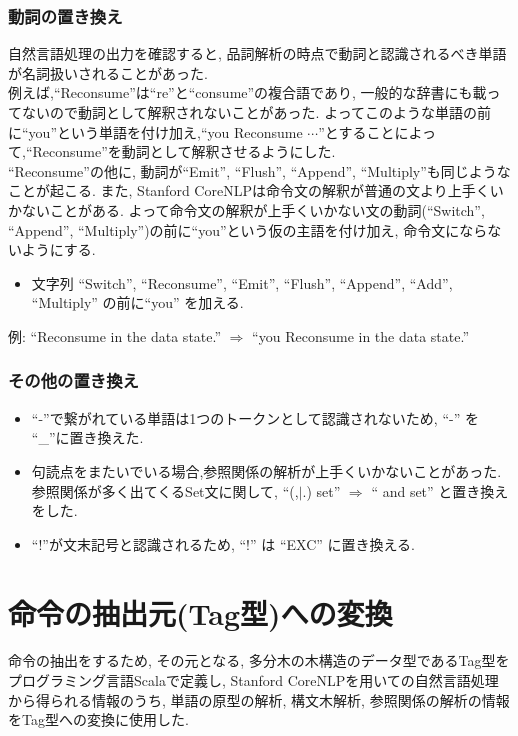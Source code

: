 \documentclass[uplatex,a4j]{jsreport}
\begin{document}
\subsubsection*{動詞の置き換え}
自然言語処理の出力を確認すると, 品詞解析の時点で動詞と認識されるべき単語が名詞扱いされることがあった.\\
例えば,``Reconsume''は``re''と``consume''の複合語であり, 一般的な辞書にも載ってないので動詞として解釈されないことがあった.
よってこのような単語の前に``you''という単語を付け加え,``you Reconsume $\cdots$''とすることによって,``Reconsume''を動詞として解釈させるようにした.\\
``Reconsume''の他に, 動詞が``Emit'', ``Flush'', ``Append'', ``Multiply''も同じようなことが起こる.
また, Stanford CoreNLPは命令文の解釈が普通の文より上手くいかないことがある.
よって命令文の解釈が上手くいかない文の動詞(``Switch'', ``Append'', ``Multiply'')の前に``you''という仮の主語を付け加え, 命令文にならないようにする.
\begin{itemize}
   \item 文字列 ``Switch'', ``Reconsume'', ``Emit'', ``Flush'', ``Append'', ``Add'', ``Multiply'' の前に``you'' を加える.
\end{itemize}
例: 
``Reconsume in the data state.'' $\Rightarrow$ ``you Reconsume in the data state.''
\subsubsection*{その他の置き換え}
\begin{itemize}
   \item ``-''で繋がれている単語は1つのトークンとして認識されないため, ``-'' を ``_''に置き換えた.
   \item 句読点をまたいでいる場合,参照関係の解析が上手くいかないことがあった. 参照関係が多く出てくるSet文に関して, 
   ``(,$|$.) set'' $\Rightarrow$ `` and set'' と置き換えをした.
   \item ``!''が文末記号と認識されるため, ``!'' は ``EXC'' に置き換える.
\end{itemize}

\section{命令の抽出元(Tag型)への変換}
命令の抽出をするため, その元となる, 多分木の木構造のデータ型であるTag型をプログラミング言語Scalaで定義し, 
Stanford CoreNLPを用いての自然言語処理から得られる情報のうち,
単語の原型の解析, 構文木解析, 参照関係の解析の情報をTag型への変換に使用した.
\end{document}
